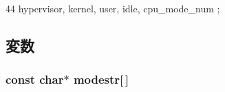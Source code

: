 \begin{DoxyCode}
44 { hypervisor, kernel, user, idle, cpu_mode_num };
\end{DoxyCode}


\subsection{変数}
\hypertarget{namespaceSparcISA_1_1Kernel_aaab5092bc6d1c40a90ff4c7450649ace}{
\subsubsection[{modestr}]{\setlength{\rightskip}{0pt plus 5cm}const char$\ast$ {\bf modestr}\mbox{[}$\,$\mbox{]}}}
\label{namespaceSparcISA_1_1Kernel_aaab5092bc6d1c40a90ff4c7450649ace}
